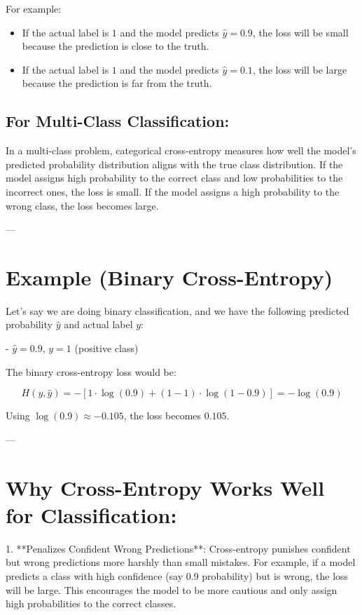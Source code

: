 \documentclass[12pt]{book}
\begin{document}
For example:
\begin{itemize}
    \item [-] If the actual label is \( 1 \) and the model predicts \( \hat{y} = 0.9 \), the loss will be small because the prediction is close to the truth.
    \item [-] If the actual label is \( 1 \) and the model predicts \( \hat{y} = 0.1 \), the loss will be large because the prediction is far from the truth.
\end{itemize}

\subsection{For Multi-Class Classification:}
In a multi-class problem, categorical cross-entropy measures how well the model's predicted probability distribution aligns with the true class distribution. If the model assigns high probability to the correct class and low probabilities to the incorrect ones, the loss is small. If the model assigns a high probability to the wrong class, the loss becomes large.

---

\section{Example (Binary Cross-Entropy)}

Let’s say we are doing binary classification, and we have the following predicted probability \( \hat{y} \) and actual label \( y \):

- \( \hat{y} = 0.9 \), \( y = 1 \) (positive class)

The binary cross-entropy loss would be:

\[
H(y, \hat{y}) = - [1 \cdot \log(0.9) + (1 - 1) \cdot \log(1 - 0.9)] = - \log(0.9)
\]

Using \( \log(0.9) \approx -0.105 \), the loss becomes \( 0.105 \).

---

\section{Why Cross-Entropy Works Well for Classification:}

1. **Penalizes Confident Wrong Predictions**:  
   Cross-entropy punishes confident but wrong predictions more harshly than small mistakes. For example, if a model predicts a class with high confidence (say 0.9 probability) but is wrong, the loss will be large. This encourages the model to be more cautious and only assign high probabilities to the correct classes.
\end{document}
